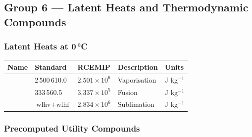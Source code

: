 \subsection{Group 6 --- Latent Heats and Thermodynamic Compounds}

\subsubsection{Latent Heats at 0\,°C}

\begin{longtable}{L{3cm} L{4cm} L{3.5cm} L{3.5cm} L{2cm}}
  \toprule
  \textbf{Name} & \textbf{Standard} & \textbf{RCEMIP} & \textbf{Description} & \textbf{Units} \\
  \midrule
  \endhead
  \bottomrule
  \endfoot
   & 2\,500\,610.0              & $2.501\times10^6$ & Vaporisation   & J kg$^{-1}$ \\
   & 333\,560.5                 & $3.337\times10^5$ & Fusion         & J kg$^{-1}$ \\
   & $\text{wlhv}+\text{wlhf}$ & $2.834\times10^6$ & Sublimation    & J kg$^{-1}$ \\
\end{longtable}

\subsubsection{Precomputed Utility Compounds}


